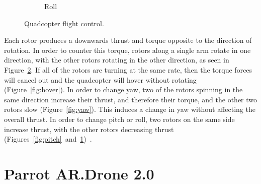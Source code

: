 \begin{figure}[ht]
\begin{subfigure}[b]{0.4\textwidth}
                        \caption{Roll}
                        \label{fig:roll}
                \end{subfigure}
                \caption{Quadcopter flight control.}\label{fig:flightbasics}
        \end{figure}

        Each rotor produces a downwards thrust and torque opposite to the direction of rotation. In order to counter this torque, rotors along a single arm rotate in one direction, with the other rotors rotating in the other direction, as seen in Figure~\ref{fig:flightbasics}. If all of the rotors are turning at the same rate, then the torque forces will cancel out and the quadcopter will hover without rotating (Figure~\ref{fig:hover}). In order to change yaw, two of the rotors spinning in the same direction increase their thrust, and therefore their torque, and the other two rotors slow (Figure~\ref{fig:yaw}). This induces a change in yaw without affecting the overall thrust. In order to change pitch or roll, two rotors on the same side increase thrust, with the other rotors decreasing thrust (Figures~\ref{fig:pitch}~and~\ref{fig:roll})~\cite{Dijkshoorn}.

\section{Parrot AR.Drone 2.0}

